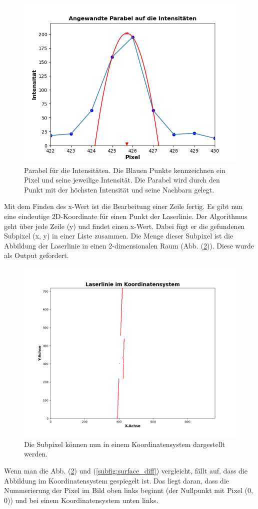 	\begin{figure}[h]
		\centering
		\includegraphics[width=0.7\linewidth]{img/hauptteil/bildverarbeitung/parable_intensities.png}
		\caption[Angewandte Parabel auf die Intensitäten]{Parabel für die Intensitäten. Die Blauen Punkte kennzeichnen ein Pixel und seine jeweilige Intensität. Die Parabel wird durch den Punkt mit der höchsten Intensität und seine Nachbarn gelegt.}
		\label{fig:parable}
	\end{figure} 
	
	Mit dem Finden des x-Wert ist die Bearbeitung einer Zeile fertig. Es gibt nun eine eindeutige 2D-Koordinate für einen Punkt der Laserlinie. Der Algorithmus geht über jede Zeile (y) und findet einen x-Wert. Dabei fügt er die gefundenen Subpixel (x, y) in einer Liste zusammen. Die Menge dieser Subpixel ist die Abbildung der Laserlinie in einen 2-dimensionalen Raum (Abb. (\ref{fig:pix_koord})). Diese wurde als Output gefordert.
	
	\begin{figure}[h]
		\centering
		\includegraphics[width=0.8\linewidth]{img/hauptteil/bildverarbeitung/pixel_koord.png}
		\caption[Subpixel im Koordinatensystem]{Die Subpixel können nun in einem Koordinatensystem dargestellt werden.}
		\label{fig:pix_koord}
	\end{figure} 

	Wenn man die Abb. (\ref{fig:pix_koord}) und (\ref{subfig:surface_diff}) vergleicht, fällt auf, dass die Abbildung im Koordinatensystem gespiegelt ist. Das liegt daran, dass die Nummerierung der Pixel im Bild oben links beginnt (der Nullpunkt mit Pixel (0, 0)) und bei einem Koordinatensystem unten links. 

	\label{chap:erkennen_der_laserlinie}
